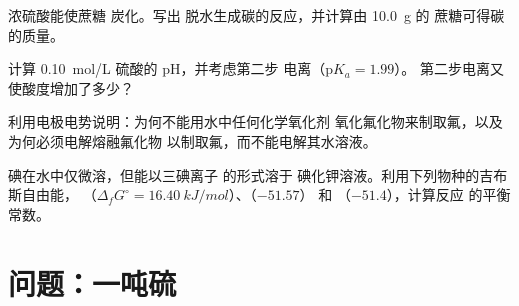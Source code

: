 \begin{exercise}[$\star\star$]\label{exo:b1:p-block-16-18:9}
浓硫酸能使蔗糖  炭化。写出
脱水生成碳的反应，并计算由 \qty{10.0}{g} 的
蔗糖可得碳的质量。
\end{exercise}

\begin{exercise}[$\star\star\star$]\label{exo:b1:p-block-16-18:10}
计算 \qty{0.10}{mol/L} 硫酸的 pH，并考虑第二步
电离（$\mathrm{p}K_a = 1.99$）。
第二步电离又使酸度增加了多少？
\end{exercise}

\begin{exercise}[$\star\star\star$]\label{exo:b1:p-block-16-18:11}
利用电极电势说明：为何不能用水中任何化学氧化剂
氧化氟化物来制取氟，以及为何必须电解熔融氟化物
以制取氟，而不能电解其水溶液。
\end{exercise}

\begin{exercise}[$\star\star\star$]\label{exo:b1:p-block-16-18:12}
碘在水中仅微溶，但能以三碘离子  的形式溶于
碘化钾溶液。利用下列物种的吉布斯自由能，
（$\Delta_f G^\circ = \qty{16.40}{kJ/mol}$）、（$-51.57$）
和 （$-51.4$），计算反应  的平衡常数。
\end{exercise}

\section{问题：一吨硫}


